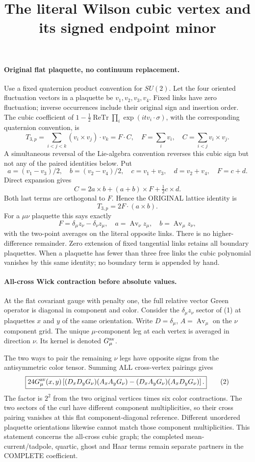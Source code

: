 \documentclass[11pt]{article}
\title{The literal Wilson cubic vertex and its signed endpoint minor}\author{}\date{}
\begin{document}
\maketitle
\paragraph{Original flat plaquette, no continuum replacement.}
Use a fixed quaternion product convention for
$SU(2)$. Let the four oriented fluctuation vectors in a plaquette
be $v_1,v_2,v_3,v_4$. Fixed links have zero fluctuation; inverse
occurrences include their original sign and insertion order.
The cubic coefficient of $1-\frac12\operatorname{ReTr}\prod_i
\exp(i t v_i\cdot\sigma)$, with the corresponding quaternion convention,
is
\[
 T_{3,p}=\sum_{i<j<k}(v_i\times v_j)\cdot v_k
       =F\cdot C,\quad
 F=\sum_i v_i,\quad C=\sum_{i<j}v_i\times v_j .
\]
A simultaneous reversal of the Lie-algebra convention reverses this
cubic sign but not any of the paired identities below.
Put
\[
 a=(v_1-v_3)/2,\quad b=(v_2-v_4)/2,\quad
 c=v_1+v_3,\quad d=v_2+v_4,\quad F=c+d .
\]
Direct expansion gives
\[
 C=2a\times b+(a+b)\times F+\tfrac12c\times d.
\]
Both last terms are orthogonal to $F$. Hence the ORIGINAL lattice
identity is
\[
 \boxed{T_{3,p}=2F\cdot(a\times b).}                              \tag{1}
\]
For a $\mu\nu$ plaquette this says exactly
\[
 F=\delta_\mu z_\nu-\delta_\nu z_\mu,\quad
 a=\operatorname{Av}_\nu z_\mu,\quad
 b=\operatorname{Av}_\mu z_\nu,
\]
with the two-point averages on the literal opposite links.
There is no higher-difference remainder. Zero extension of fixed
tangential links retains all boundary plaquettes. When a plaquette
has fewer than three free links the cubic polynomial vanishes by this
same identity; no boundary term is appended by hand.

\paragraph{All-cross Wick contraction before absolute values.}
At the flat covariant gauge with penalty one, the full relative vector
Green operator is diagonal in component and color. Consider the
$\delta_\mu z_\nu$ sector of (1) at plaquettes $x$ and $y$ of the same
orientation. Write $D=\delta_\mu$, $A=\operatorname{Av}_\mu$ on the
$\nu$ component grid. The unique $\mu$-component leg at each vertex
is averaged in direction $\nu$. Its kernel is denoted $G_\mu^{\rm av}$.

The two ways to pair the remaining $\nu$ legs have opposite signs from
the antisymmetric color tensor. Summing ALL cross-vertex pairings gives
\[
 \boxed{24G_\mu^{\rm av}(x,y)
 \left[(D_xD_yG_\nu)(A_xA_yG_\nu)
             -(D_xA_yG_\nu)(A_xD_yG_\nu)\right].}                \tag{2}
\]
The factor is $2^2$ from the two original vertices times six color
contractions. The two sectors of the curl have different component
multiplicities, so their cross pairing vanishes at this flat
component-diagonal reference. Different unordered plaquette
orientations likewise cannot match those component multiplicities.
This statement concerns the all-cross cubic graph; the completed
mean-current/tadpole, quartic, ghost and Haar terms remain separate
partners in the COMPLETE coefficient.
\end{document}
